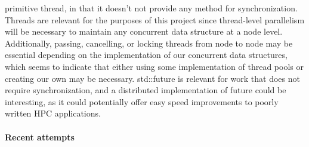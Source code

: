 primitive thread, in that it doesn't not provide any method for synchronization. Threads are relevant for the purposes of this project since thread-level parallelism will be necessary to maintain any concurrent data structure at a node level. Additionally, passing, cancelling, or locking threads from node to node may be essential depending on the implementation of our concurrent data structures, which seems to indicate that either using some implementation of thread pools or creating our own may be necessary. std::future is relevant for work that does not require synchronization, and a distributed implementation of future could be interesting, as it could potentially offer easy speed improvements to poorly written HPC applications. 

\paragraph{Recent attempts}
